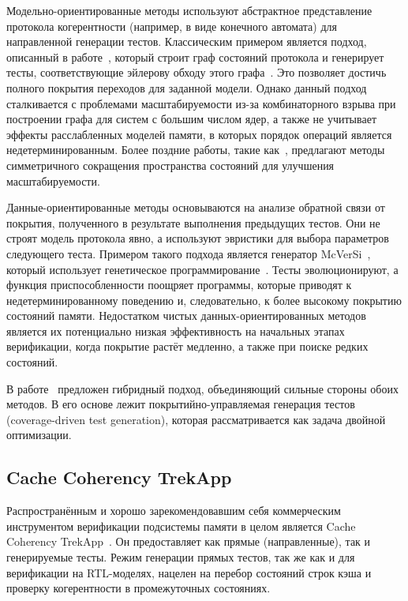 Модельно-ориентированные методы используют абстрактное представление
протокола когерентности (например, в виде конечного автомата) для
направленной генерации тестов. Классическим примером является подход,
описанный в работе~\cite{qin2012automated}, который строит граф
состояний протокола и генерирует тесты, соответствующие эйлерову
обходу этого графа~\cite{euler}. Это позволяет достичь полного
покрытия переходов для заданной модели. Однако данный подход
сталкивается с проблемами масштабируемости из-за комбинаторного
взрыва при построении графа для систем с большим числом ядер, а также
не учитывает эффекты расслабленных моделей памяти, в которых порядок
операций является недетерминированным. Более поздние работы, такие
как~\cite{lyu2018directed}, предлагают методы симметричного
сокращения пространства состояний для улучшения масштабируемости.

Данные-ориентированные методы основываются на анализе обратной связи
от покрытия, полученного в результате выполнения предыдущих тестов.
Они не строят модель протокола явно, а используют эвристики для
выбора параметров следующего теста. Примером такого подхода является
генератор McVerSi~\cite{elver2016mcversi}, который использует
генетическое программирование~\cite{ahvanooey2019survey}. Тесты
эволюционируют, а функция приспособленности поощряет программы,
которые приводят к недетерминированному поведению и, следовательно, к
более высокому покрытию состояний памяти. Недостатком чистых
данных-ориентированных методов является их потенциально низкая
эффективность на начальных этапах верификации, когда покрытие растёт
медленно, а также при поиске редких состояний.

В работе~\cite{andrade2019chaining} предложен гибридный подход,
объединяющий сильные стороны обоих методов. В его основе лежит
покрытийно-управляемая генерация тестов (coverage-driven test
generation), которая рассматривается как задача двойной оптимизации.

\subsection{Cache Coherency TrekApp}
\label{sec:ch1/trekapp}

Распространённым и хорошо зарекомендовавшим себя коммерческим
инструментом верификации подсистемы памяти в целом является Cache
Coherency TrekApp~\cite{breker1}. Он предоставляет как прямые
(направленные), так и генерируемые тесты. Режим генерации прямых
тестов, так же как и для верификации на RTL-моделях, нацелен на перебор
состояний строк кэша и проверку когерентности в промежуточных состояниях.

